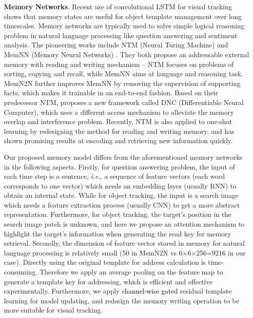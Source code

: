\documentclass[runningheads]{llncs}
\newcommand{\abc}[1]{\textcolor{black}{#1}}
\begin{document}
\textbf{Memory Networks}. Recent use of convolutional LSTM for visual tracking \cite{Yang2017} shows that memory states %
are useful for object template management over long timescales. Memory networks are typically used to solve simple logical reasoning problem in natural language processing like question answering and sentiment analysis. The pioneering works include NTM (Neural Turing Machine) \cite{Graves2014} and MemNN (Memory Neural Networks) \cite{Weston2015}. They both propose an addressable external memory with reading and writing mechanism -- NTM focuses on problems of sorting, copying and recall, while MemNN aims at language and reasoning task. MemN2N %
\cite{Sukhbaatar2015} further improves MemNN by removing the supervision of supporting facts, which makes it trainable in an end-to-end fashion. Based on their predecessor NTM, %
\cite{Graves2016} proposes a new framework called DNC (Differentiable Neural Computer), which uses a different access mechanism to alleviate the memory overlap and interference problem.
Recently, NTM is also applied to one-shot learning \cite{Santoro2016} by redesigning the method for reading and writing memory, and has shown promising results at %
encoding and retrieving new information quickly. 

Our proposed memory model differs from the aforementioned memory networks in the following aspects. Firstly, for question answering problem, the input of each time step is a sentence,
\emph{i.e.}, a sequence of feature vectors (each word corresponds to one vector) which needs an embedding layer (usually RNN) to obtain an internal state. While for object tracking, the input is a search image which needs a feature extraction process (usually CNN) to get a more abstract representation. Furthermore, for object tracking, the target's position in the search image patch is unknown, and here we propose an attention mechanism to highlight the target's information when generating the read key for memory retrieval. 
Secondly, the dimension of feature vector stored in memory for natural language processing is relatively small (50 in MemN2N vs 6$\times$6$\times$256=9216 in our case). %
Directly using the original template for address calculation is time-consuming.  Therefore we apply an average pooling on the feature map to generate a template key for addressing, which is efficient and effective experimentally. 
Furthermore, we apply \abc{channel-wise gated} residual template learning for model updating, and redesign the memory writing operation %
to be more suitable for visual tracking.
\end{document}
